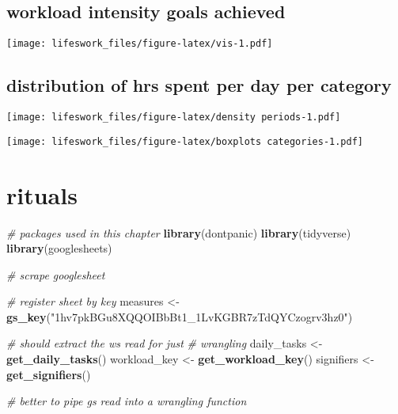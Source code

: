 \documentclass[]{book}
\newenvironment{Shaded}{\begin{snugshade}}{\end{snugshade}}
\newcommand{\CommentTok}[1]{\textcolor[rgb]{0.56,0.35,0.01}{\textit{#1}}}
\newcommand{\KeywordTok}[1]{\textcolor[rgb]{0.13,0.29,0.53}{\textbf{#1}}}
\newcommand{\NormalTok}[1]{#1}
\newcommand{\StringTok}[1]{\textcolor[rgb]{0.31,0.60,0.02}{#1}}
\begin{document}
\hypertarget{workload-intensity-goals-achieved}{%
\section{workload intensity goals achieved}\label{workload-intensity-goals-achieved}}

\texttt{[image: lifeswork\_files/figure-latex/vis-1.pdf]}

\hypertarget{distribution-of-hrs-spent-per-day-per-category}{%
\section{distribution of hrs spent per day per category}\label{distribution-of-hrs-spent-per-day-per-category}}

\texttt{[image: lifeswork\_files/figure-latex/density periods-1.pdf]}

\texttt{[image: lifeswork\_files/figure-latex/boxplots categories-1.pdf]}

\hypertarget{rituals}{%
\chapter{rituals}\label{rituals}}

\begin{Shaded}
\begin{Highlighting}[]
\CommentTok{# packages used in this chapter}
\KeywordTok{library}\NormalTok{(dontpanic)}
\KeywordTok{library}\NormalTok{(tidyverse)}
\KeywordTok{library}\NormalTok{(googlesheets)}
\end{Highlighting}
\end{Shaded}

\begin{Shaded}
\begin{Highlighting}[]
\CommentTok{# scrape googlesheet}

\CommentTok{# register sheet by key}
\NormalTok{measures <-}\StringTok{ }\KeywordTok{gs_key}\NormalTok{(}\StringTok{"1hv7pkBGu8XQQOIBbBt1_1LvKGBR7zTdQYCzogrv3hz0"}\NormalTok{)}


\CommentTok{# should extract the ws read for just}
\CommentTok{# wrangling}
\NormalTok{daily_tasks <-}\StringTok{ }\KeywordTok{get_daily_tasks}\NormalTok{()}
\NormalTok{workload_key <-}\StringTok{ }\KeywordTok{get_workload_key}\NormalTok{()}
\NormalTok{signifiers <-}\StringTok{ }\KeywordTok{get_signifiers}\NormalTok{()}

\CommentTok{# better to pipe gs read into a wrangling function}
\end{Highlighting}
\end{Shaded}
\end{document}
